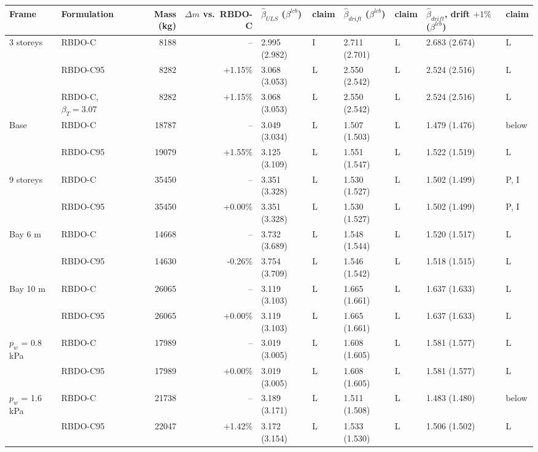 \begin{tabular}{llrrllllll}
\toprule
Frame & Formulation & Mass (kg) & $\Delta m$ vs.\ RBDO-C & $\hat\beta_{ULS}$ ($\beta^{lcb}$) & claim & $\hat\beta_{drift}$ ($\beta^{lcb}$) & claim & $\hat\beta_{drift}$, drift $+1\%$ ($\beta^{lcb}$) & claim \\
\midrule
3 storeys & RBDO-C & 8188 & -- & 2.995 (2.982) & I & 2.711 (2.701) & L & 2.683 (2.674) & L \\
 & RBDO-C95 & 8282 & +1.15\% & 3.068 (3.053) & L & 2.550 (2.542) & L & 2.524 (2.516) & L \\
 & RBDO-C, $\beta_T=3.07$ & 8282 & +1.15\% & 3.068 (3.053) & L & 2.550 (2.542) & L & 2.524 (2.516) & L \\
\midrule
Base & RBDO-C & 18787 & -- & 3.049 (3.034) & L & 1.507 (1.503) & L & 1.479 (1.476) & below \\
 & RBDO-C95 & 19079 & +1.55\% & 3.125 (3.109) & L & 1.551 (1.547) & L & 1.522 (1.519) & L \\
\midrule
9 storeys & RBDO-C & 35450 & -- & 3.351 (3.328) & L & 1.530 (1.527) & L & 1.502 (1.499) & P, I \\
 & RBDO-C95 & 35450 & +0.00\% & 3.351 (3.328) & L & 1.530 (1.527) & L & 1.502 (1.499) & P, I \\
\midrule
Bay 6 m & RBDO-C & 14668 & -- & 3.732 (3.689) & L & 1.548 (1.544) & L & 1.520 (1.517) & L \\
 & RBDO-C95 & 14630 & -0.26\% & 3.754 (3.709) & L & 1.546 (1.542) & L & 1.518 (1.515) & L \\
\midrule
Bay 10 m & RBDO-C & 26065 & -- & 3.119 (3.103) & L & 1.665 (1.661) & L & 1.637 (1.633) & L \\
 & RBDO-C95 & 26065 & +0.00\% & 3.119 (3.103) & L & 1.665 (1.661) & L & 1.637 (1.633) & L \\
\midrule
$p_w$ = 0.8 kPa & RBDO-C & 17989 & -- & 3.019 (3.005) & L & 1.608 (1.605) & L & 1.581 (1.577) & L \\
 & RBDO-C95 & 17989 & +0.00\% & 3.019 (3.005) & L & 1.608 (1.605) & L & 1.581 (1.577) & L \\
\midrule
$p_w$ = 1.6 kPa & RBDO-C & 21738 & -- & 3.189 (3.171) & L & 1.511 (1.508) & L & 1.483 (1.480) & below \\
 & RBDO-C95 & 22047 & +1.42\% & 3.172 (3.154) & L & 1.533 (1.530) & L & 1.506 (1.502) & L \\
\bottomrule
\end{tabular}